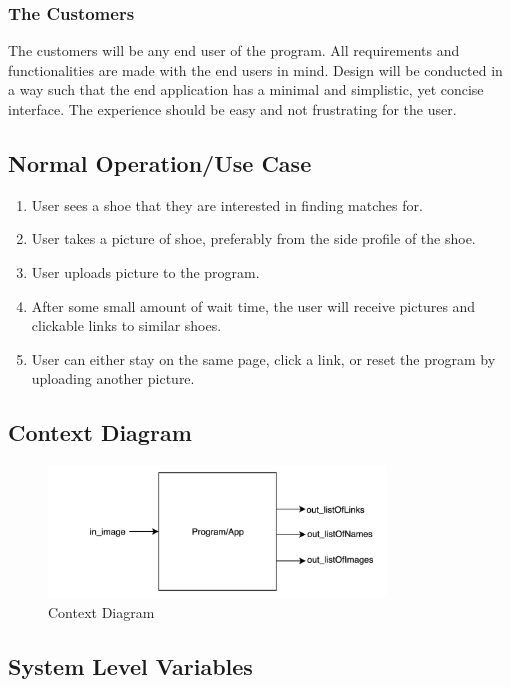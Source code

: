\documentclass[12pt, titlepage]{article}
\begin{document}
\subsubsection{The Customers}
The customers will be any end user of the program. All requirements and functionalities are made with the end users in mind. Design will be conducted in a way such that the end application has a minimal and simplistic, yet concise interface. The experience should be easy and not frustrating for the user.

\subsection{Normal Operation/Use Case}
\begin{enumerate}
    \item User sees a shoe that they are interested in finding matches for.
    \item User takes a picture of shoe, preferably from the side profile of the shoe.
    \item User uploads picture to the program.
    \item After some small amount of wait time, the user will receive pictures and clickable links to similar shoes.
    \item User can either stay on the same page, click a link, or reset the program by uploading another picture.
    
\end{enumerate}

\subsection{Context Diagram}

\begin{figure}[!htbp]
  \centering
  \includegraphics[width=0.8\textwidth]{images/Context-Diagram.png}
  \caption{Context Diagram}
\end{figure}

\newpage
\subsection{System Level Variables}
\end{document}
